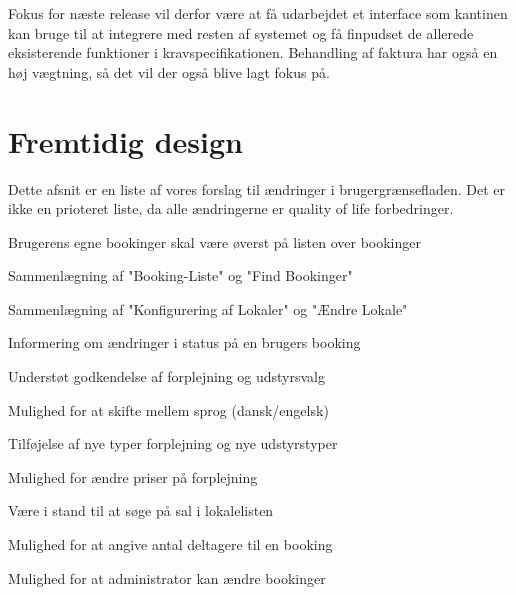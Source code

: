 Fokus for næste release vil derfor være at få udarbejdet et interface som kantinen kan bruge til at integrere med resten af systemet og få finpudset de allerede eksisterende funktioner i kravspecifikationen. Behandling af faktura har også en høj vægtning, så det vil der også blive lagt fokus på. 


\section{Fremtidig design}
\label{Design_G_Future}
Dette afsnit er en liste af vores forslag til ændringer i brugergrænsefladen. Det er ikke en prioteret liste, da alle ændringerne er quality of life forbedringer.

\begin{my_itemize}
\item{Brugerens egne bookinger skal være øverst på listen over bookinger}
\item{Sammenlægning af "Booking-Liste" og "Find Bookinger"}
\item{Sammenlægning af "Konfigurering af Lokaler" og "Ændre Lokale"}
\item{Informering om ændringer i status på en brugers booking}
\item{Understøt godkendelse af forplejning og udstyrsvalg}
\item{Mulighed for at skifte mellem sprog (dansk/engelsk)}
\item{Tilføjelse af nye typer forplejning og nye udstyrstyper}
\item{Mulighed for ændre priser på forplejning}
\item{Være i stand til at søge på sal i lokalelisten}
\item{Mulighed for at angive antal deltagere til en booking}
\item{Mulighed for at administrator kan ændre bookinger}
\end{my_itemize}
